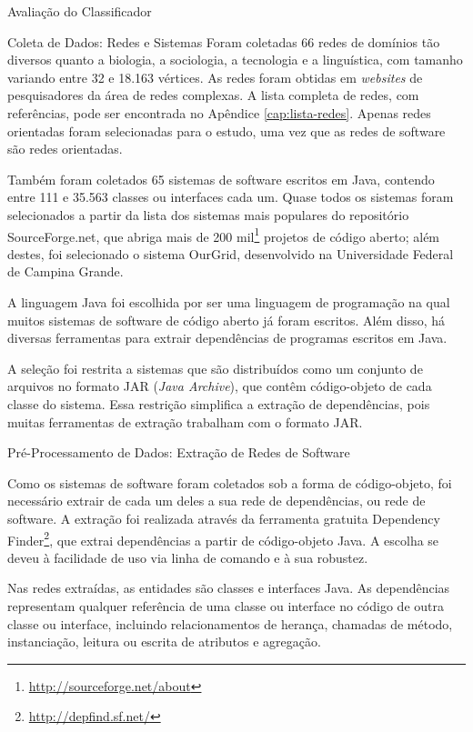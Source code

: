 \begin{section}{Avaliação do Classificador}
\begin{subsection}{Coleta de Dados: Redes e Sistemas}
			Foram coletadas 66 redes de domínios tão diversos quanto a biologia, a sociologia, a tecnologia e a linguística, com tamanho variando entre 32 e 18.163 vértices. As redes foram obtidas em \emph{websites} de pesquisadores da área de redes complexas. A lista completa de redes, com referências, pode ser encontrada no Apêndice \ref{cap:lista-redes}. Apenas redes orientadas foram selecionadas para o estudo, uma vez que as redes de software são redes orientadas. 

		  Também foram coletados 65 sistemas de software escritos em Java, contendo entre 111 e 35.563 classes ou interfaces cada um. Quase todos os sistemas foram selecionados a partir da lista dos sistemas mais populares do repositório SourceForge.net, que abriga mais de 200 mil\footnote{\url{http://sourceforge.net/about}} projetos de código aberto; além destes, foi selecionado o sistema OurGrid, desenvolvido na Universidade Federal de Campina Grande. 

			A linguagem Java foi escolhida por ser uma linguagem de programação na qual muitos sistemas de software de código aberto já foram escritos. Além disso, há diversas ferramentas para extrair dependências de programas escritos em Java.

			A seleção foi restrita a sistemas que são distribuídos como um conjunto de arquivos no formato JAR (\emph{Java Archive}), que contêm código-objeto de cada classe do sistema. Essa restrição simplifica a extração de dependências, pois muitas ferramentas de extração trabalham com o formato JAR.

\end{subsection}

\begin{subsection}{Pré-Processamento de Dados: Extração de Redes de Software}

	Como os sistemas de software foram coletados sob a forma de código-objeto, foi necessário extrair de cada um deles a sua rede de dependências, ou rede de software. A extração foi realizada através da ferramenta gratuita Dependency Finder\footnote{\url{http://depfind.sf.net/}}, que extrai dependências a partir de código-objeto Java. A escolha se deveu à facilidade de uso via linha de comando e à sua robustez.

	Nas redes extraídas, as entidades são classes e interfaces Java. As dependências representam qualquer referência de uma classe ou interface no código de outra classe ou interface, incluindo relacionamentos de herança, chamadas de método, instanciação, leitura ou escrita de atributos e agregação.


\end{subsection}
\end{section}
